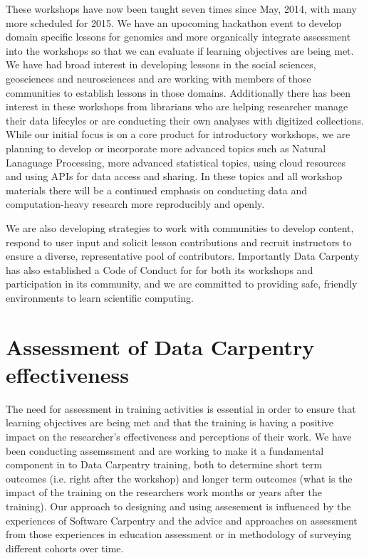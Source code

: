 \documentclass[15]{idcc}
\begin{document}
\begin{itemize}
These workshops have now been taught seven times since May, 2014, with many more scheduled for 2015. We have an
  upocoming hackathon event to develop domain specific lessons for genomics and more organically integrate assessment
  into the workshops so that we can evaluate if learning objectives are being met. We have had broad interest in developing lessons
  in the social sciences, geosciences and neurosciences and are working with members of those communities to establish lessons in those
  domains. Additionally there has been interest in these workshops from librarians who are helping researcher manage their data lifecyles
 or are conducting their own analyses with digitized collections.\\

 While our initial focus is on a core product for introductory workshops, we are planning to develop or incorporate more advanced topics
 such as Natural Lanaguage Processing, more advanced statistical topics, using cloud resources and using APIs for data access and sharing. In these topics and all workshop materials there will be a continued emphasis on conducting data and computation-heavy research more reproducibly and openly.

 We are also developing strategies to work with communities to develop content, respond to user input and solicit lesson contributions and recruit instructors to ensure a diverse, representative pool of contributors. Importantly Data Carpenty has also established a Code of Conduct for
 for both its workshops and participation in its community, and we are committed to providing safe, friendly environments to learn scientific computing.


\section{Assessment of Data Carpentry effectiveness}
The need for assessment in training activities is essential in order to ensure that learning objectives are being met and that the
training is having a positive impact on the researcher's effectiveness and perceptions of their work. We have been conducting
assemssment and are working to make it a fundamental component in to Data Carpentry training, both to determine short term outcomes
(i.e. right after
the workshop) and longer term outcomes (what is the impact of the training on the researchers work months or years after the
training). Our approach to designing and using assesement is influenced by
the experiences of Software Carpentry and the advice and approaches on assessment from those experiences in education assessment or
in methodology of surveying different cohorts over time. \\


\end{itemize}
\end{document}

